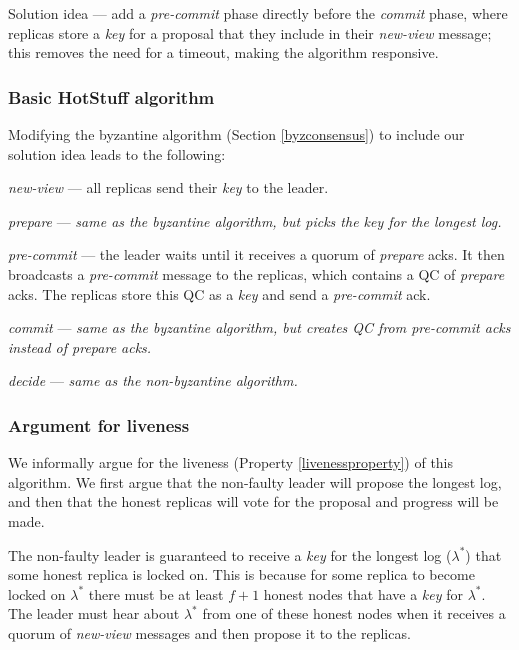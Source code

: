 Solution idea --- add a \textit{pre-commit} phase directly before the \textit{commit} phase, where replicas store a \textit{key} for a proposal that they include in their \textit{new-view} message; this removes the need for a timeout, making the algorithm responsive.

\subsubsection{Basic HotStuff algorithm}

Modifying the byzantine algorithm (Section \ref{byzconsensus}) to include our solution idea leads to the following:

\begin{description}
	\item \textit{new-view} --- all replicas send their \textit{key} to the leader.
	\item \textit{prepare} ---  \textit{same as the byzantine algorithm, but picks the key for the longest log.}
	\item \textit{pre-commit} --- the leader waits until it receives a quorum of \textit{prepare} acks. It then broadcasts a \textit{pre-commit} message to the replicas, which contains a QC of \textit{prepare} acks. The replicas store this QC as a \textit{key} and send a \textit{pre-commit} ack.
	\item \textit{commit} --- \textit{same as the byzantine algorithm, but creates QC from pre-commit acks instead of prepare acks.}
	\item \textit{decide} --- \textit{same as the non-byzantine algorithm.}
\end{description}

\subsubsection{Argument for liveness} \label{livenessargument}
We informally argue for the liveness (Property \ref{livenessproperty}) of this algorithm. We first argue that the non-faulty leader will propose the longest log, and then that the honest replicas will vote for the proposal and progress will be made.

The non-faulty leader is guaranteed to receive a \textit{key} for the longest log ($\lambda^*$) that some honest replica is locked on. This is because for some replica to become locked on $\lambda^*$ there must be at least $f + 1$ honest nodes that have a \textit{key} for $\lambda^*$. The leader must hear about $\lambda^*$ from one of these honest nodes when it receives a quorum of \textit{new-view} messages and then propose it to the replicas.

